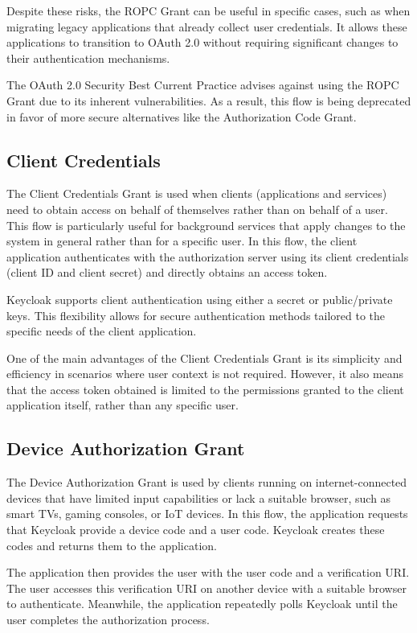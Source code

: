 Despite these risks, the ROPC Grant can be useful in specific cases, such as when migrating legacy applications that already collect user credentials. It allows these applications to transition to OAuth 2.0 without requiring significant changes to their authentication mechanisms.

The OAuth 2.0 Security Best Current Practice advises against using the ROPC Grant due to its inherent vulnerabilities. As a result, this flow is being deprecated in favor of more secure alternatives like the Authorization Code Grant.

\subsection*{Client Credentials}
The Client Credentials Grant is used when clients (applications and services) need to obtain access on behalf of themselves rather than on behalf of a user. This flow is particularly useful for background services that apply changes to the system in general rather than for a specific user. In this flow, the client application authenticates with the authorization server using its client credentials (client ID and client secret) and directly obtains an access token.

Keycloak supports client authentication using either a secret or public/private keys. This flexibility allows for secure authentication methods tailored to the specific needs of the client application.

One of the main advantages of the Client Credentials Grant is its simplicity and efficiency in scenarios where user context is not required. However, it also means that the access token obtained is limited to the permissions granted to the client application itself, rather than any specific user.

\subsection*{Device Authorization Grant}
The Device Authorization Grant is used by clients running on internet-connected devices that have limited input capabilities or lack a suitable browser, such as smart TVs, gaming consoles, or IoT devices. In this flow, the application requests that Keycloak provide a device code and a user code. Keycloak creates these codes and returns them to the application.

The application then provides the user with the user code and a verification URI. The user accesses this verification URI on another device with a suitable browser to authenticate. Meanwhile, the application repeatedly polls Keycloak until the user completes the authorization process.

